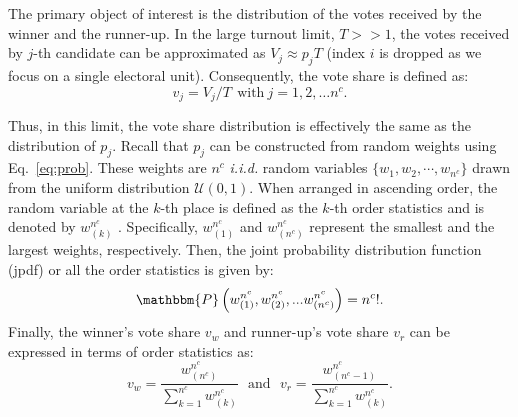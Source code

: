 \documentclass[reprint, pre, twocolumn, aps, showpacs, superscriptaddress]{revtex4-2}
\begin{document}
The primary object of interest is the distribution of the votes received by the winner and the runner-up. In the large turnout limit, $T >> 1$, the votes received by $j$-th candidate can be approximated as $V_j \approx p_j T$ (index $i$ is dropped as we focus on a single electoral unit). Consequently, the vote share is defined as:
\begin{equation}
    v_j = V_j/T ~~ \text{with} ~ j = 1, 2, \dots n^c.
    \label{eq:voteshare}
\end{equation}

Thus, in this limit, the vote share distribution is effectively the same as the distribution of $p_j$. Recall that $p_j$ can be constructed from random weights using Eq.~\ref{eq:prob}. These weights are $n^c$ \emph{i.i.d.} random variables $\{w_1, w_2, \cdots, w_{n^c}\}$ drawn from the uniform distribution $\mathcal{U}(0, 1)$. When arranged in ascending order, the random variable at the $k$-th place is defined as the $k$-th order statistics and is denoted by $w^{n^c}_{(k)}$ \cite{BarBalNag2008}. Specifically, $w^{n^c}_{(1)}$ and $w^{n^c}_{(n^c)}$ represent the smallest and the largest weights, respectively. Then, the joint probability distribution function (jpdf) or all the order statistics is given by:
\begin{equation}
    \mathbbm{P}\left(w^{n^c}_{(1)}, w^{n^c}_{(2)}, ... w^{n^c}_{(n^c)}\right) = n^c!.
    \label{eq:jpdf1}
\end{equation}
Finally, the winner's vote share $v_w$ and runner-up's vote share $v_r$ can be expressed in terms of order statistics as:
\begin{equation}
    v_w = \frac{w^{n^c}_{(n^c)}}{\sum_{k = 1}^{n^c}w^{n^c}_{(k)}} ~~~\text{and}~~~ v_r = \frac{w^{n^c}_{(n^c - 1)}}{\sum_{k = 1}^{n^c}w^{n^c}_{(k)}}.
    \label{eq:voteshare_order_stat}
\end{equation}
\end{document}
